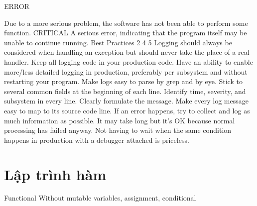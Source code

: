 ERROR

Due to a more serious problem, the software has not been able to perform some function.
CRITICAL	A serious error, indicating that the program itself may be unable to continue running.
Best Practices 2 4 5
Logging should always be considered when handling an exception but should never take the place of a real handler.
Keep all logging code in your production code. Have an ability to enable more/less detailed logging in production, preferably per subsystem and without restarting your program.
Make logs easy to parse by grep and by eye. Stick to several common fields at the beginning of each line. Identify time, severity, and subsystem in every line. Clearly formulate the message. Make every log message easy to map to its source code line.
If an error happens, try to collect and log as much information as possible. It may take long but it's OK because normal processing has failed anyway. Not having to wait when the same condition happens in production with a debugger attached is priceless.

\section{Lập trình hàm}

Functional
Without mutable variables, assignment, conditional

